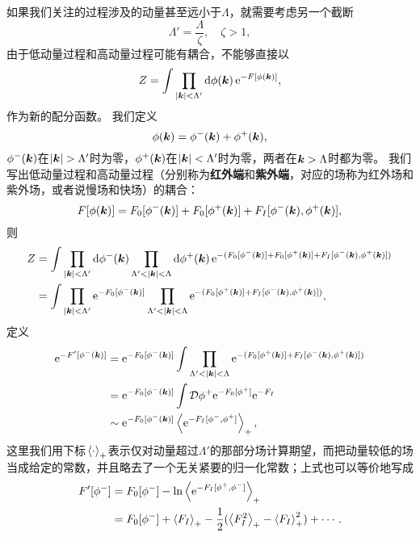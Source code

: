 \documentclass[hyperref, UTF8, a4paper]{ctexart}
\newcommand*{\ee}{\mathrm{e}}
\newcommand*{\fd}[1]{\mathcal{D}{#1}}
\begin{document}
如果我们关注的过程涉及的动量甚至远小于$\Lambda$，就需要考虑另一个截断
\[
    \Lambda' = \frac{\Lambda}{\zeta}, \quad \zeta > 1,
\]
由于低动量过程和高动量过程可能有耦合，不能够直接以
\[
    Z = \int \prod_{\abs{\vb*{k}} < \Lambda' } \dd{\phi(\vb*{k})} \ee^{ - F[\phi(\vb*{k})]},
\]
作为新的配分函数。
我们定义
\[
    \phi(\vb*{k}) = \phi^-(\vb*{k}) + \phi^+(\vb*{k}),
\]
$\phi^-(\vb*{k})$在$\abs{\vb*{k}} > \Lambda'$时为零，$\phi^+(\vb*{k})$在$\abs{\vb*{k}} < \Lambda'$时为零，两者在$\vb*{k} > \Lambda$时都为零。
我们写出低动量过程和高动量过程（分别称为\textbf{红外端}和\textbf{紫外端}，对应的场称为红外场和紫外场，或者说慢场和快场）的耦合：
\[
    F[\phi(\vb*{k})] = F_0 [\phi^-(\vb*{k})] + F_0 [\phi^+(\vb*{k})] + F_I [\phi^-(\vb*{k}) , \phi^+ (\vb*{k})],
\]
则
\[
    \begin{aligned}
        Z &= \int \prod_{\abs{\vb*{k}} < \Lambda'} \dd{\phi^{-}(\vb*{k})} \prod_{\Lambda' < \abs{\vb*{k}} < \Lambda} \dd{\phi^+ (\vb*{k})} \ee^{- (F_0 [\phi^-(\vb*{k})] + F_0 [\phi^+(\vb*{k})] + F_I [\phi^-(\vb*{k}) , \phi^+ (\vb*{k})])} \\
        &= \int \prod_{\abs{\vb*{k}} < \Lambda'} \ee^{- F_0 [\phi^-(\vb*{k})]} \prod_{\Lambda' < \abs{\vb*{k}} < \Lambda} \ee^{- (F_0 [\phi^+(\vb*{k})] + F_I [\phi^-(\vb*{k}) , \phi^+ (\vb*{k})])},
    \end{aligned}
\]
定义
\begin{equation}
    \begin{aligned}
        \ee^{-F'[\phi^-(\vb*{k})]} &= \ee^{- F_0 [\phi^-(\vb*{k})]} \int \prod_{\Lambda' < \abs{\vb*{k}} < \Lambda} \ee^{- (F_0 [\phi^+(\vb*{k})] + F_I [\phi^-(\vb*{k}) , \phi^+ (\vb*{k})])} \\
        &= \ee^{- F_0 [\phi^-(\vb*{k})]} \int \fd{\phi^+} \ee^{-F_0[\phi^+]} \ee^{-F_I} \\
        &\sim \ee^{- F_0 [\phi^-(\vb*{k})]} \expval{\ee^{-F_I[\phi^-, \phi^+]}}_+,
    \end{aligned}
\end{equation}
这里我们用下标$\expval*{\cdot}_+$表示仅对动量超过$\Lambda'$的那部分场计算期望，而把动量较低的场当成给定的常数，并且略去了一个无关紧要的归一化常数；上式也可以等价地写成
\begin{equation}
    \begin{aligned}
        F'[\phi^-] &= F_0[\phi^-] - \ln \expval{\ee^{-F_I[\phi^+, \phi^-]}}_+ \\
        &= F_0[\phi^-] + \expval{F_I}_+ - \frac{1}{2} ( \expval{F_I^2}_+ - \expval{F_I}^2_+ ) + \cdots.
    \end{aligned}
\end{equation}
\end{document}

